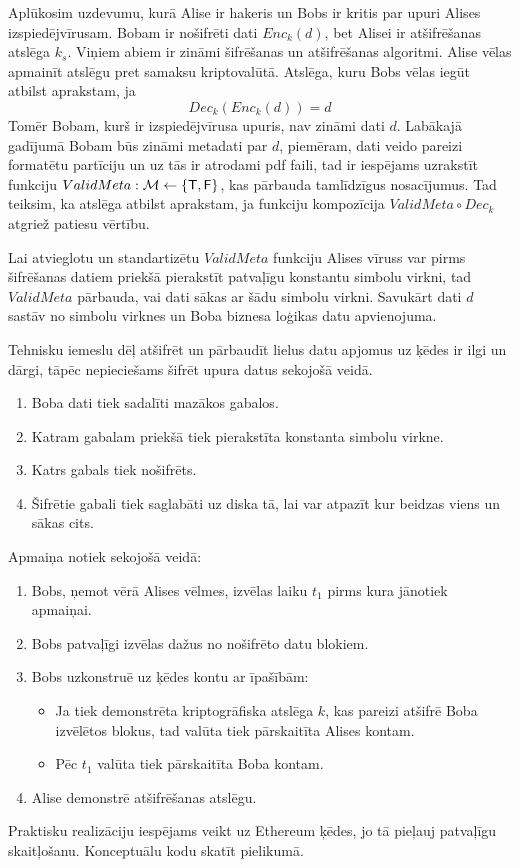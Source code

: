 Aplūkosim uzdevumu, kurā Alise ir hakeris un Bobs ir kritis par upuri Alises izspiedējvīrusam.
Bobam ir nošifrēti dati $Enc_k(d)$, bet Alisei ir atšifrēšanas atslēga $k_s$. Viņiem abiem ir zināmi šifrēšanas un atšifrēšanas algoritmi. Alise vēlas apmainīt atslēgu pret samaksu kriptovalūtā. Atslēga, kuru Bobs vēlas iegūt atbilst aprakstam, ja
\begin{equation*}
    Dec_k(Enc_k(d)) = d
\end{equation*}
Tomēr Bobam, kurš ir izspiedējvīrusa upuris, nav zināmi dati $d$. Labākajā gadījumā Bobam būs zināmi metadati par $d$, piemēram, dati veido pareizi formatētu partīciju un uz tās ir atrodami pdf faili, tad ir iespējams uzrakstīt funkciju $ValidMeta: \mathcal{M} \leftarrow \left\{ \textsf{T},\textsf{F} \right\}$, kas pārbauda tamlīdzīgus nosacījumus. Tad teiksim, ka atslēga atbilst aprakstam, ja funkciju kompozīcija $ValidMeta \circ Dec_k$ atgriež patiesu vērtību.

Lai atvieglotu un standartizētu $ValidMeta$ funkciju Alises vīruss var pirms šifrēšanas datiem priekšā pierakstīt patvaļīgu konstantu simbolu virkni, tad $ValidMeta$ pārbauda, vai dati sākas ar šādu simbolu virkni. Savukārt dati $d$ sastāv no simbolu virknes un Boba biznesa loģikas datu apvienojuma.

Tehnisku iemeslu dēļ atšifrēt un pārbaudīt lielus datu apjomus uz ķēdes ir ilgi un dārgi, tāpēc nepieciešams šifrēt upura datus sekojošā veidā.
\begin{enumerate}
    \item Boba dati tiek sadalīti mazākos gabalos.
    \item Katram gabalam priekšā tiek pierakstīta konstanta simbolu virkne.
    \item Katrs gabals tiek nošifrēts.
    \item Šifrētie gabali tiek saglabāti uz diska tā, lai var atpazīt kur beidzas viens un sākas cits.
\end{enumerate}
Apmaiņa notiek sekojošā veidā:
\begin{enumerate}
    \item Bobs, ņemot vērā Alises vēlmes, izvēlas laiku $t_1$ pirms kura jānotiek apmaiņai.
    \item Bobs patvaļīgi izvēlas dažus no nošifrēto datu blokiem.
    \item Bobs uzkonstruē uz ķēdes kontu ar īpašībām:
        \begin{itemize}
            \item Ja tiek demonstrēta kriptogrāfiska atslēga $k$, kas pareizi atšifrē Boba izvēlētos blokus, tad valūta tiek pārskaitīta Alises kontam.
            \item Pēc $t_1$ valūta tiek pārskaitīta Boba kontam.
        \end{itemize}
    \item Alise demonstrē atšifrēšanas atslēgu.
\end{enumerate}

Praktisku realizāciju iespējams veikt uz Ethereum ķēdes, jo tā pieļauj patvaļīgu skaitļošanu. Konceptuālu kodu skatīt pielikumā.
